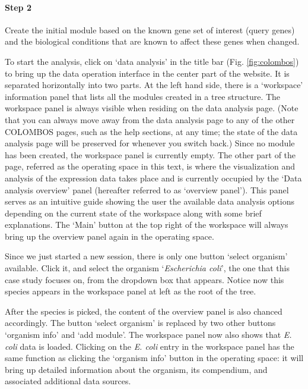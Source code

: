 \paragraph{Step 2}	Create the initial module based on the known gene set of 
interest (query genes) and the biological conditions that are known to affect 
these genes when changed.

\begin{adjustwidth}{5mm}{0cm}
	To start the analysis, click on `data 
analysis' in the title bar (Fig. \ref{fig:colombos}) to bring up the data 
operation interface in the center part of the website. 
It is separated horizontally into two parts. At the left hand side, 
there is a `workspace' information panel that lists all the modules created in 
a tree structure. The workspace panel is always visible when residing on the 
data analysis page. (Note that you can always move away from the data analysis 
page to any of the other COLOMBOS pages, such as the help sections, at any 
time; the state of the data analysis page will be preserved for whenever you 
switch back.)  Since no module has been created, the workspace panel is 
currently empty. The other part of the page, referred as the operating space in 
this text, is where the visualization and analysis of the expression data takes 
place and is currently occupied by the `Data analysis overview' panel 
(hereafter referred to as `overview panel'). This panel serves as an intuitive 
guide showing the user the available data analysis options depending on the 
current state of the workspace along with some brief explanations. The `Main' 
button at the top right of the workspace will always bring up the overview 
panel again in the operating space.
\end{adjustwidth}

\begin{adjustwidth}{5mm}{0cm}
Since we just started a new session, there is only one button `select organism' 
available. Click it, and select the organism `\textit{Escherichia coli}', the 
one that this case study focuses on, from the dropdown box that appears. Notice 
now this species appears in the workspace panel at left as the root of the 
tree.
\end{adjustwidth}

\begin{adjustwidth}{5mm}{0cm}
	After the species is picked, the content of the 
overview panel is also chanced accordingly. The button `select 
organism' is replaced by two other buttons `organism info' and `add module'. 
The workspace panel now also shows that \textit{E. coli} data is loaded. 
Clicking on the \textit{E. coli} entry in the workspace panel has the same 
function as clicking the `organism info' button in the operating space: it will 
bring up detailed information about the organism, its compendium, and 
associated additional data sources. 
\end{adjustwidth}


